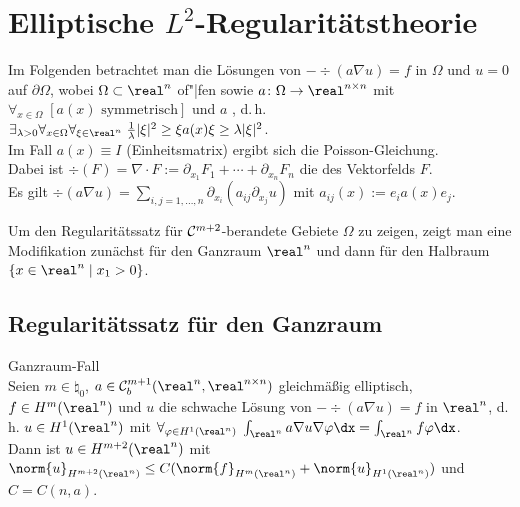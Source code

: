 \chapter{%
    Elliptische \texorpdfstring{$L^2$}{L²}-Regularitätstheorie%
}

\begin{Bem}
    Im Folgenden betrachtet man die Lösungen von
    $-\div(a \nabla u) = f$ in $\Omega$ und $u = 0$ auf $\partial\Omega$, wobei
    $\Omega \subset \real^n$ of"|fen sowie $a\colon \Omega \rightarrow \real^{n \times n}$ mit
    $\forall_{x \in \Omega}\; [\text{$a(x)$ symmetrisch}]$ und
    $a$ , d.\,h.
    $\exists_{\lambda > 0} \forall_{x \in \Omega} \forall_{\xi \in \real^n}\;
    \frac{1}{\lambda} |\xi|^2 \ge \xi a(x) \xi \ge \lambda |\xi|^2$.\\
    Im Fall $a(x) \equiv I$ (Einheitsmatrix) ergibt sich die Poisson-Gleichung.\\
    Dabei ist $\div(F) = \nabla \cdot F := \partial_{x_1} F_1 + \dotsb + \partial_{x_n} F_n$
    die  des Vektorfelds $F$.\\
    Es gilt $\div(a \nabla u) = \sum_{i,j=1,\dotsc,n} \partial_{x_i} (a_{ij} \partial_{x_j} u)$ mit
    $a_{ij}(x) := e_i a(x) e_j$.
\end{Bem}

\begin{Bem}
    Um den Regularitätssatz für $\mathcal{C}^{m+2}$-berandete Gebiete $\Omega$ zu zeigen, zeigt man
    eine Modifikation zunächst für den Ganzraum
    $\real^n$ und dann für den Halbraum $\{x \in \real^n \;|\; x_1 > 0\}$.
\end{Bem}

\section{%
    Regularitätssatz für den Ganzraum%
}

\begin{Satz}{Ganzraum-Fall}\\
    Seien $m \in \natural_0$,
    $a \in \C^{m+1}_b(\real^n, \real^{n \times n})$ gleichmäßig elliptisch,
    $f \in H^m(\real^n)$ und $u$ die schwache Lösung von
    $-\div(a \nabla u) = f$ in $\real^n$, d.\,h.
    $u \in H^1(\real^n)$ mit $\forall_{\varphi \in H^1(\real^n)}\;
    \int_{\real^n} a \nabla u \nabla\varphi \dx = \int_{\real^n} f\varphi \dx$.\\
    Dann ist $u \in H^{m+2}(\real^n)$ mit
    $\norm{u}_{H^{m+2}(\real^n)} \le
    C (\norm{f}_{H^m(\real^n)} + \norm{u}_{H^1(\real^n)})$ und $C = C(n, a)$.
\end{Satz}

